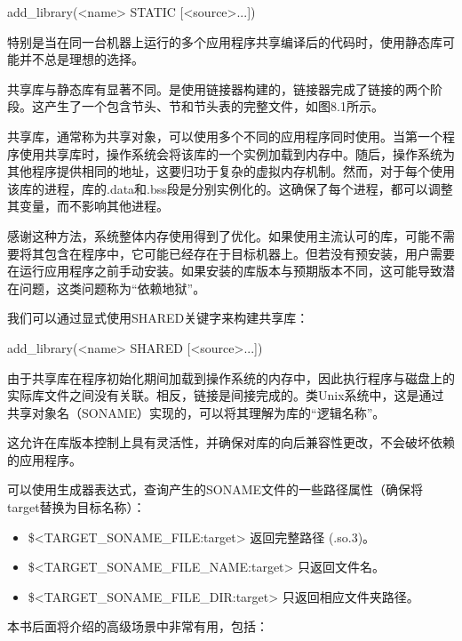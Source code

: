 \begin{shell}
add_library(<name> STATIC [<source>...])
\end{shell}

特别是当在同一台机器上运行的多个应用程序共享编译后的代码时，使用静态库可能并不总是理想的选择。


共享库与静态库有显著不同。是使用链接器构建的，链接器完成了链接的两个阶段。这产生了一个包含节头、节和节头表的完整文件，如图8.1所示。

共享库，通常称为共享对象，可以使用多个不同的应用程序同时使用。当第一个程序使用共享库时，操作系统会将该库的一个实例加载到内存中。随后，操作系统为其他程序提供相同的地址，这要归功于复杂的虚拟内存机制。然而，对于每个使用该库的进程，库的.data和.bss段是分别实例化的。这确保了每个进程，都可以调整其变量，而不影响其他进程。

感谢这种方法，系统整体内存使用得到了优化。如果使用主流认可的库，可能不需要将其包含在程序中，它可能已经存在于目标机器上。但若没有预安装，用户需要在运行应用程序之前手动安装。如果安装的库版本与预期版本不同，这可能导致潜在问题，这类问题称为“依赖地狱”。

我们可以通过显式使用SHARED关键字来构建共享库：

\begin{shell}
add_library(<name> SHARED [<source>...])
\end{shell}

由于共享库在程序初始化期间加载到操作系统的内存中，因此执行程序与磁盘上的实际库文件之间没有关联。相反，链接是间接完成的。类Unix系统中，这是通过共享对象名（SONAME）实现的，可以将其理解为库的“逻辑名称”。

这允许在库版本控制上具有灵活性，并确保对库的向后兼容性更改，不会破坏依赖的应用程序。

可以使用生成器表达式，查询产生的SONAME文件的一些路径属性（确保将target替换为目标名称）：

\begin{itemize}
\item
\$<TARGET\_SONAME\_FILE:target> 返回完整路径 (.so.3)。

\item
\$<TARGET\_SONAME\_FILE\_NAME:target> 只返回文件名。

\item
\$<TARGET\_SONAME\_FILE\_DIR:target> 只返回相应文件夹路径。
\end{itemize}

本书后面将介绍的高级场景中非常有用，包括：

